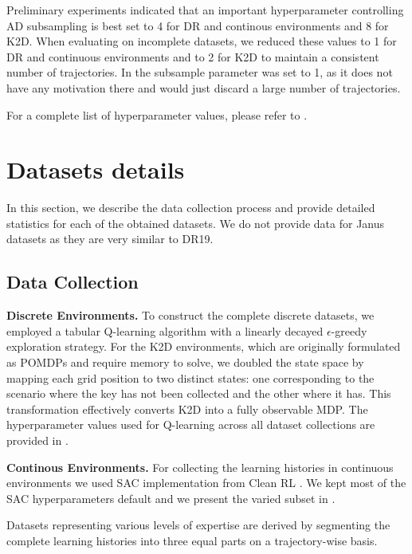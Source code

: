 \documentclass{article} %
\begin{document}
Preliminary experiments indicated that an important hyperparameter controlling AD subsampling is best set to 4 for DR and continous environments and 8 for K2D. When evaluating on incomplete datasets, we reduced these values to 1 for DR and continuous environments and to 2 for K2D to maintain a consistent number of trajectories. In  the subsample parameter was set to 1, as it does not have any motivation there and would just discard a large number of trajectories.

For a complete list of hyperparameter values, please refer to .

\section{Datasets details}
\label{app:datasets}
In this section, we describe the data collection process and provide detailed statistics for each of the obtained datasets. We do not provide data for Janus datasets as they are very similar to DR19.

\subsection{Data Collection}
\textbf{Discrete Environments.} To construct the complete discrete datasets, we employed a tabular Q-learning algorithm \citep{watkins1992q} with a linearly decayed 
$\epsilon$-greedy exploration strategy. For the K2D environments, which are originally formulated as POMDPs and require memory to solve, we doubled the state space by mapping each grid position to two distinct states: one corresponding to the scenario where the key has not been collected and the other where it has. This transformation effectively converts K2D into a fully observable MDP. The hyperparameter values used for Q-learning across all dataset collections are provided in .


\textbf{Continous Environments.} For collecting the learning histories in continuous environments we used SAC implementation from Clean RL \citep{huang2022cleanrl}. 
We kept most of the SAC hyperparameters default and we present the varied subset in .


Datasets representing various levels of expertise are derived by segmenting the complete learning histories into three equal parts on a trajectory-wise basis.
\end{document}

